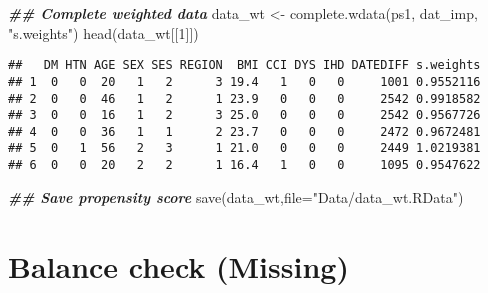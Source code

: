 \documentclass[
]{book}
\newenvironment{Shaded}{\begin{snugshade}}{\end{snugshade}}
\newcommand{\AttributeTok}[1]{\textcolor[rgb]{0.77,0.63,0.00}{#1}}
\newcommand{\DecValTok}[1]{\textcolor[rgb]{0.00,0.00,0.81}{#1}}
\newcommand{\DocumentationTok}[1]{\textcolor[rgb]{0.56,0.35,0.01}{\textbf{\textit{#1}}}}
\newcommand{\FunctionTok}[1]{\textcolor[rgb]{0.00,0.00,0.00}{#1}}
\newcommand{\NormalTok}[1]{#1}
\newcommand{\OtherTok}[1]{\textcolor[rgb]{0.56,0.35,0.01}{#1}}
\newcommand{\StringTok}[1]{\textcolor[rgb]{0.31,0.60,0.02}{#1}}
\theoremstyle{definition}
\theoremstyle{definition}
\theoremstyle{definition}
\theoremstyle{definition}
\theoremstyle{remark}
\begin{document}
\begin{Shaded}
\begin{Highlighting}[]
\DocumentationTok{\#\# Complete weighted data}
\NormalTok{data\_wt }\OtherTok{\textless{}{-}} \FunctionTok{complete.wdata}\NormalTok{(ps1, dat\_imp, }\StringTok{"s.weights"}\NormalTok{)}
\FunctionTok{head}\NormalTok{(data\_wt[[}\DecValTok{1}\NormalTok{]])}
\end{Highlighting}
\end{Shaded}

\begin{verbatim}
##   DM HTN AGE SEX SES REGION  BMI CCI DYS IHD DATEDIFF s.weights
## 1  0   0  20   1   2      3 19.4   1   0   0     1001 0.9552116
## 2  0   0  46   1   2      1 23.9   0   0   0     2542 0.9918582
## 3  0   0  16   1   2      3 25.0   0   0   0     2542 0.9567726
## 4  0   0  36   1   1      2 23.7   0   0   0     2472 0.9672481
## 5  0   1  56   2   3      1 21.0   0   0   0     2449 1.0219381
## 6  0   0  20   2   2      1 16.4   1   0   0     1095 0.9547622
\end{verbatim}

\begin{Shaded}
\begin{Highlighting}[]
\DocumentationTok{\#\# Save propensity score}
\FunctionTok{save}\NormalTok{(data\_wt,}\AttributeTok{file=}\StringTok{"Data/data\_wt.RData"}\NormalTok{)}
\end{Highlighting}
\end{Shaded}

\hypertarget{balance-check-missing-1}{%
\section{Balance check (Missing)}\label{balance-check-missing-1}}
\end{document}
